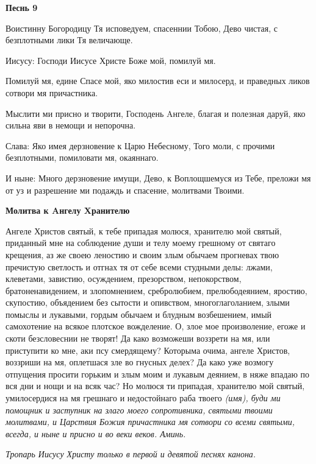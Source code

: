 \medskip
\bfseries Песнь 9\normalfont{}


  Воистинну Богородицу Тя исповедуем, спасеннии Тобою, Дево чистая, с безплотными лики Тя величающе.


  Иисусу: Господи Иисусе Христе Боже мой, помилуй мя.


  Помилуй мя, едине Спасе мой, яко милостив еси и милосерд, и праведных ликов сотвори мя причастника.


  Мыслити ми присно и творити, Господень Aнгеле, благая и полезная даруй, яко сильна яви в немощи и непорочна.


  Слава: Яко имея дерзновение к Царю Небесному, Того моли, с прочими безплотными, помиловати мя, окаяннаго.


  И ныне: Много дерзновение имущи, Дево, к Воплощшемуся из Тебе, преложи мя от уз и разрешение ми подаждь и спасение, молитвами Твоими.




\medskip


\bfseries Молитва к Aнгелу Xранителю\normalfont{}


  Ангеле Христов святый, к тебе припадая молюся, хранителю мой святый, приданный мне на соблюдение души и телу моему грешному от святаго крещения, аз же своею леностию и своим злым обычаем прогневах твою пречистую светлость и отгнах тя от себе всеми студными делы: лжами, клеветами, завистию, осуждением, презорством, непокорством, братоненавидением, и злопомнением, сребролюбием, прелюбодеянием, яростию, скупостию, объядением без сытости и опивством, многоглаголанием, злыми помыслы и лукавыми, гордым обычаем и блудным возбешением, имый самохотение на всякое плотское вожделение. О, злое мое произволение, егоже и скоти безсловеснии не творят! Да како возможеши воззрети на мя, или приступити ко мне, аки псу смердящему? Которыма очима, ангеле Христов, воззриши на мя, оплетшася зле во гнусных делех? Да како уже возмогу отпущения просити горьким и злым моим и лукавым деянием, в няже впадаю по вся дни и нощи и на всяк час? Но молюся ти припадая, хранителю мой святый, умилосердися на мя грешнаго и недостойнаго раба твоего \itshape (имя)\normalfont{}, буди ми помощник и заступник на злаго моего сопротивника, святыми твоими молитвами, и Царствия Божия причастника мя сотвори со всеми святыми, всегда, и ныне и присно и во веки веков. Аминь.




\itshape * Тропарь Иисусу Христу только в первой и девятой песнях канона.\normalfont{} 

\mychapterending

